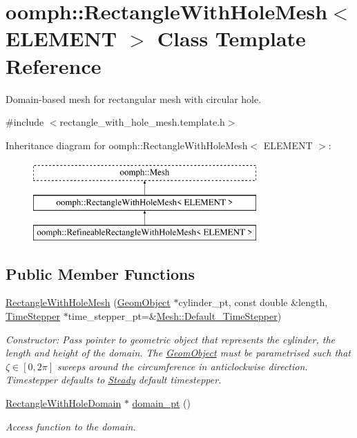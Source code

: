 \hypertarget{classoomph_1_1RectangleWithHoleMesh}{}\section{oomph\+:\+:Rectangle\+With\+Hole\+Mesh$<$ E\+L\+E\+M\+E\+NT $>$ Class Template Reference}
\label{classoomph_1_1RectangleWithHoleMesh}


Domain-\/based mesh for rectangular mesh with circular hole.  




{\ttfamily \#include $<$rectangle\+\_\+with\+\_\+hole\+\_\+mesh.\+template.\+h$>$}

Inheritance diagram for oomph\+:\+:Rectangle\+With\+Hole\+Mesh$<$ E\+L\+E\+M\+E\+NT $>$\+:\begin{figure}[H]
\begin{center}
\leavevmode
\includegraphics[height=3.000000cm]{classoomph_1_1RectangleWithHoleMesh}
\end{center}
\end{figure}
\subsection*{Public Member Functions}
\begin{DoxyCompactItemize}
\item 
\hyperlink{classoomph_1_1RectangleWithHoleMesh_aa5080c0cbd60211cafda6f8d77326eae}{Rectangle\+With\+Hole\+Mesh} (\hyperlink{classoomph_1_1GeomObject}{Geom\+Object} $\ast$cylinder\+\_\+pt, const double \&length, \hyperlink{classoomph_1_1TimeStepper}{Time\+Stepper} $\ast$time\+\_\+stepper\+\_\+pt=\&\hyperlink{classoomph_1_1Mesh_a12243d0fee2b1fcee729ee5a4777ea10}{Mesh\+::\+Default\+\_\+\+Time\+Stepper})
\begin{DoxyCompactList}\small\item\em Constructor\+: Pass pointer to geometric object that represents the cylinder, the length and height of the domain. The \hyperlink{classoomph_1_1GeomObject}{Geom\+Object} must be parametrised such that $\zeta \in [0,2\pi]$ sweeps around the circumference in anticlockwise direction. Timestepper defaults to \hyperlink{classoomph_1_1Steady}{Steady} default timestepper. \end{DoxyCompactList}\item 
\hyperlink{classoomph_1_1RectangleWithHoleDomain}{Rectangle\+With\+Hole\+Domain} $\ast$ \hyperlink{classoomph_1_1RectangleWithHoleMesh_a800865b6bb11c07a505245967c0febd0}{domain\+\_\+pt} ()
\begin{DoxyCompactList}\small\item\em Access function to the domain. \end{DoxyCompactList}\end{DoxyCompactItemize}
